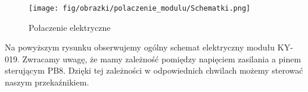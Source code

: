 \documentclass[11pt, a4paper]{article}
\begin{document}


\vspace{0.5cm}
\begin{figure}[h!]
    \centering
    \texttt{[image: fig/obrazki/polaczenie\_modulu/Schematki.png]}
    \caption{Połaczenie elektryczne}
    \label{fig:my_label}
\end{figure}
\vspace{0.5cm}

Na powyższym rysunku obserwujemy ogólny schemat elektryczny modułu KY-019. Zwracamy uwagę, że mamy zależność pomiędzy napięciem zasilania a pinem sterującym PB8. Dzięki tej zależności w odpowiednich chwilach możemy sterować naszym przekaźnikiem.

\newpage
\end{document}
